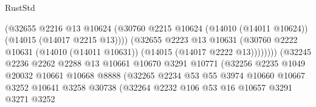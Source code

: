 \begin{lexlean}{RustStd}
\begin{coremodule}
                                          (@32655
                                            @2216
                                            @13
                                            @10624
                                            (@30760
                                              @2215
                                              @10624
                                              (@14010 (@14011 @10624))
                                              (@14015 (@14017 @2215 @13))))
                                          (@32655
                                            @2223
                                            @13
                                            @10631
                                            (@30760
                                              @2222
                                              @10631
                                              (@14010 (@14011 @10631))
                                              (@14015 (@14017 @2222 @13))))))))
                                  (@32245
                                    @2236
                                    @2262
                                    @2288
                                    @13
                                    @10661
                                    @10670
                                    @3291
                                    @10771
                                    (@32256
                                      @2235
                                      @1049
                                      @20032
                                      @10661
                                      @10668
                                      @8888
                                      (@32265
                                        @2234
                                        @53
                                        @55
                                        @3974
                                        @10660
                                        @10667
                                        @3252
                                        @10641
                                        @3258
                                        @30738
                                        (@32264
                                          @2232
                                          @106
                                          @53
                                          @16
                                          @10657
                                          @3291
                                          @3271
                                          @3252

\end{coremodule}
\end{lexlean}
